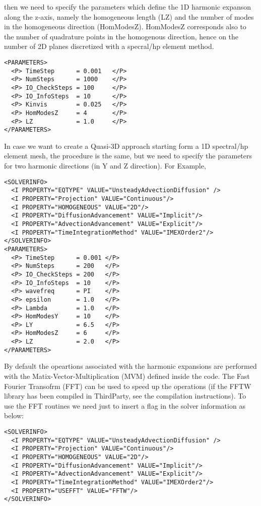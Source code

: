 then we need to specify the parameters which define the 1D harmonic expanson
along the z-axis, namely the homogeneous length (LZ) and the number of modes in
the homogeneous direction (HomModesZ). HomModesZ corresponds also to the number
of quadrature points in the homogenous direction, hence on the number of 2D
planes discretized with a specral/hp element method.

\begin{lstlisting}[style=XMLStyle]
<PARAMETERS>
  <P> TimeStep      = 0.001   </P>
  <P> NumSteps      = 1000    </P>
  <P> IO_CheckSteps = 100     </P>
  <P> IO_InfoSteps  = 10      </P>
  <P> Kinvis        = 0.025   </P>
  <P> HomModesZ     = 4       </P>
  <P> LZ            = 1.0     </P>
</PARAMETERS>
\end{lstlisting}

In case we want to create a Quasi-3D approach starting form a 1D spectral/hp
element mesh, the procedure is the same, but we need to specify the parameters
for two harmonic directions (in Y and Z direction). For Example,

\begin{lstlisting}[style=XMLStyle]
<SOLVERINFO>
  <I PROPERTY="EQTYPE" VALUE="UnsteadyAdvectionDiffusion" />
  <I PROPERTY="Projection" VALUE="Continuous"/>
  <I PROPERTY="HOMOGENEOUS" VALUE="2D"/>
  <I PROPERTY="DiffusionAdvancement" VALUE="Implicit"/>
  <I PROPERTY="AdvectionAdvancement" VALUE="Explicit"/>
  <I PROPERTY="TimeIntegrationMethod" VALUE="IMEXOrder2"/>
</SOLVERINFO>
<PARAMETERS>
  <P> TimeStep      = 0.001 </P>
  <P> NumSteps      = 200   </P>
  <P> IO_CheckSteps = 200   </P>
  <P> IO_InfoSteps  = 10    </P>
  <P> wavefreq      = PI    </P>
  <P> epsilon       = 1.0   </P>
  <P> Lambda        = 1.0   </P>
  <P> HomModesY     = 10    </P>
  <P> LY            = 6.5   </P>
  <P> HomModesZ     = 6     </P>
  <P> LZ            = 2.0   </P>
</PARAMETERS>
\end{lstlisting}

By default the opeartions associated with the harmonic expansions are performed
with the Matix-Vector-Multiplication (MVM) defined inside the code. The Fast
Fourier Transofrm (FFT) can be used to speed up the operations (if the FFTW
library has been compiled in ThirdParty, see the compilation instructions). To
use the FFT routines we need just to insert a flag in the solver information as
below:

\begin{lstlisting}[style=XMLStyle]
<SOLVERINFO>
  <I PROPERTY="EQTYPE" VALUE="UnsteadyAdvectionDiffusion" />
  <I PROPERTY="Projection" VALUE="Continuous"/>
  <I PROPERTY="HOMOGENEOUS" VALUE="2D"/>
  <I PROPERTY="DiffusionAdvancement" VALUE="Implicit"/>
  <I PROPERTY="AdvectionAdvancement" VALUE="Explicit"/>
  <I PROPERTY="TimeIntegrationMethod" VALUE="IMEXOrder2"/>
  <I PROPERTY="USEFFT" VALUE="FFTW"/>
</SOLVERINFO>
\end{lstlisting}


